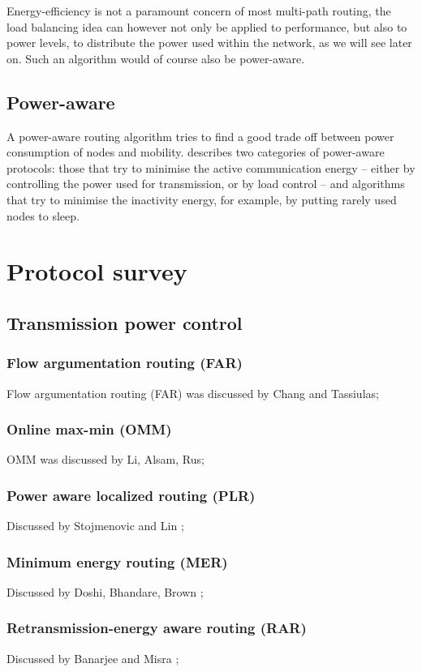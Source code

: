 \documentclass[conference]{IEEEtran}
\begin{document}
Energy-efficiency is not a paramount concern of most multi-path routing, the
load balancing idea can however not only be applied to performance, but also
to power levels, to distribute the power used within the network, as we will
see later on. Such an algorithm would of course also be power-aware.

\subsection{Power-aware}
A power-aware routing algorithm tries to find a good trade off between
power consumption of nodes and mobility. \cite{main1} describes two categories
of power-aware protocols: those that try to minimise the active communication energy -- either
by controlling the power used for transmission, or by load control -- and
algorithms that try to minimise the inactivity energy, for example, by putting
rarely used nodes to sleep.


\section{Protocol survey}
\subsection{Transmission power control}
\subsubsection{Flow argumentation routing (FAR)}
Flow argumentation routing (FAR) was discussed by Chang and Tassiulas\cite{chang2000energy};
\subsubsection{Online max-min (OMM)}
OMM was discussed by Li, Alsam, Rus\cite{li2001online};
\subsubsection{Power aware localized routing (PLR)}
Discussed by Stojmenovic and Lin \cite{stojmenovic2001power};
\subsubsection{Minimum energy routing (MER)}
Discussed by Doshi, Bhandare, Brown \cite{doshi2002demand};
\subsubsection{Retransmission-energy aware routing (RAR)}
Discussed by Banarjee and Misra \cite{banerjee2002minimum};
\end{document}
